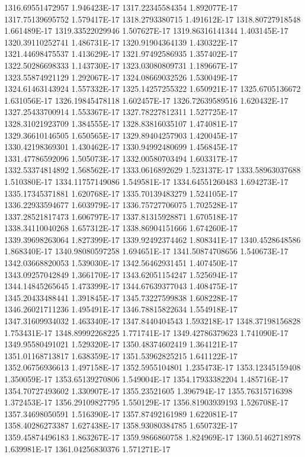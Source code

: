 1316.69551472957  1.946423E-17
1317.22345584354  1.892077E-17
1317.75139695752  1.579417E-17
1318.2793380715  1.491612E-17
1318.80727918548  1.661489E-17
1319.33522029946  1.507627E-17
1319.86316141344  1.403145E-17
1320.39110252741  1.486731E-17
1320.91904364139  1.430322E-17
1321.44698475537  1.413629E-17
1321.97492586935  1.357402E-17
1322.50286698333  1.143730E-17
1323.03080809731  1.189667E-17
1323.55874921129  1.292067E-17
1324.08669032526  1.530049E-17
1324.61463143924  1.557332E-17
1325.14257255322  1.650921E-17
1325.6705136672  1.631056E-17
1326.19845478118  1.602457E-17
1326.72639589516  1.620432E-17
1327.25433700914  1.553367E-17
1327.78227812311  1.527725E-17
1328.31021923709  1.384555E-17
1328.83816035107  1.474081E-17
1329.36610146505  1.650565E-17
1329.89404257903  1.420045E-17
1330.42198369301  1.430462E-17
1330.94992480699  1.456845E-17
1331.47786592096  1.505073E-17
1332.00580703494  1.603317E-17
1332.53374814892  1.568562E-17
1333.0616892629  1.523137E-17
1333.58963037688  1.510380E-17
1334.11757149086  1.549581E-17
1334.64551260483  1.694273E-17
1335.17345371881  1.620768E-17
1335.70139483279  1.524105E-17
1336.22933594677  1.603979E-17
1336.75727706075  1.702528E-17
1337.28521817473  1.606797E-17
1337.81315928871  1.670518E-17
1338.34110040268  1.657312E-17
1338.86904151666  1.674260E-17
1339.39698263064  1.827399E-17
1339.92492374462  1.808341E-17
1340.4528648586  1.868340E-17
1340.98080597258  1.694651E-17
1341.50874708656  1.540673E-17
1342.03668820053  1.539030E-17
1342.56462931451  1.407450E-17
1343.09257042849  1.366170E-17
1343.62051154247  1.525694E-17
1344.14845265645  1.473399E-17
1344.67639377043  1.408475E-17
1345.20433488441  1.391845E-17
1345.73227599838  1.608228E-17
1346.26021711236  1.495491E-17
1346.78815822634  1.554918E-17
1347.31609934032  1.463340E-17
1347.8440404543  1.593218E-17
1348.37198156828  1.753431E-17
1348.89992268225  1.771741E-17
1349.42786379623  1.741090E-17
1349.95580491021  1.529320E-17
1350.48374602419  1.364121E-17
1351.01168713817  1.638359E-17
1351.53962825215  1.641122E-17
1352.06756936613  1.497158E-17
1352.5955104801  1.235473E-17
1353.12345159408  1.350059E-17
1353.65139270806  1.549004E-17
1354.17933382204  1.485716E-17
1354.70727493602  1.330907E-17
1355.23521605  1.396794E-17
1355.76315716398  1.372453E-17
1356.29109827795  1.550129E-17
1356.81903939193  1.526708E-17
1357.34698050591  1.516390E-17
1357.87492161989  1.622081E-17
1358.40286273387  1.627438E-17
1358.93080384785  1.650732E-17
1359.45874496183  1.863267E-17
1359.9866860758  1.824969E-17
1360.51462718978  1.639981E-17
1361.04256830376  1.571271E-17
